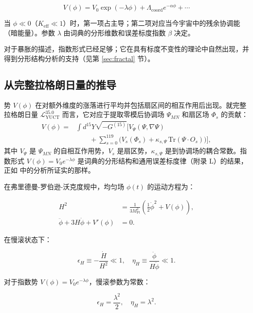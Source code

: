 \documentclass[12pt]{article}
\theoremstyle{remark}
\newcommand{\Keff}{K_{\mathrm{eff}}}
\newcommand{\Mpl}{M_{\mathrm{Pl}}}
\begin{document}
	\begin{equation}
		V(\phi) = V_0 \exp\left( -\lambda \phi \right) + \Lambda_{\mathrm{coord}} e^{-\alpha \phi} + \cdots
		\label{eq:potential}
	\end{equation}
	
	当 $\phi \ll 0$（$\Keff \ll 1$）时，第一项占主导；第二项对应当今宇宙中的残余协调能（暗能量）。参数 $\lambda$ 由词典的分形维数和误差标度指数 $\beta$ 决定。
	
	对于暴胀的描述，指数形式已经足够；它在具有标度不变性的理论中自然出现，并得到分形结构分析的支持（见第 \ref{sec:fractal} 节）。
	
	\subsection{从完整拉格朗日量的推导}
	
	势 $V(\phi)$ 在对额外维度的涨落进行平均并包括扇区间的相互作用后出现。就完整拉格朗日量 $\mathcal{L}_{\text{YUCT}}^{35.0}$ 而言，它对应于提取零模后协调场 $\Psi_{MN}$ 和扇区场 $\Phi_s$ 的贡献：
	\begin{align}
		V(\phi) = &\int d^{15}Y \sqrt{-G^{(15)}} \Big[ V_{\Psi}(\Psi,\nabla\Psi) \nonumber\\
		&\qquad + \sum_{s=0}^{119} \big( V_s(\Phi_s) + \kappa_{s,\Psi}\,\mathrm{Tr}(\Psi\cdot O_s) \big) \Big],
	\end{align}
	其中 $V_{\Psi}$ 是 $\Psi_{MN}$ 的自相互作用势，$V_s$ 是扇区势，$\kappa_{s,\Psi}$ 是到协调场的耦合常数。指数形式 $V(\phi)=V_0 e^{-\lambda\phi}$ 是词典的分形结构和通用误差标度律（附录 L）的结果，正如 \cite{Yakushev2026} 中的分析所证实的那样。
	
	在弗里德曼-罗伯逊-沃克度规中，均匀场 $\phi(t)$ 的运动方程为：
	
	\begin{align}
		H^2 &= \frac{1}{3\Mpl^2} \left( \frac{1}{2}\dot{\phi}^2 + V(\phi) \right), \label{eq:friedman1} \\
		\ddot{\phi} + 3H\dot{\phi} + V'(\phi) &= 0. \label{eq:field}
	\end{align}
	
	在慢滚状态下：
	
	\begin{equation}
		\epsilon_H \equiv -\frac{\dot{H}}{H^2} \ll 1, \quad \eta_H \equiv \frac{\ddot{\phi}}{H\dot{\phi}} \ll 1.
	\end{equation}
	
	对于指数势 $V(\phi) = V_0 e^{-\lambda \phi}$，慢滚参数为常数：
	
	\begin{equation}
		\epsilon_H = \frac{\lambda^2}{2}, \quad \eta_H = \lambda^2.
		\label{eq:slowroll}
	\end{equation}
	
\end{document}
